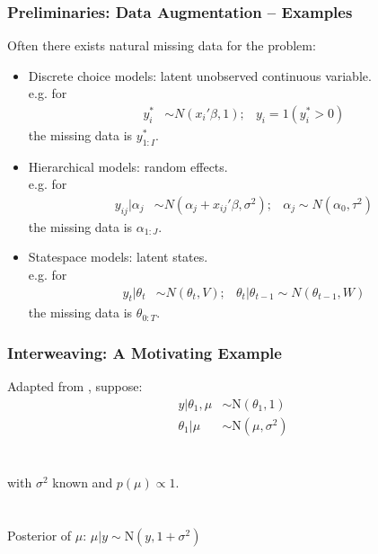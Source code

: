 \documentclass[xcolor=dvipsnames]{beamer}
\newcommand\N{\mathrm{N}}
\begin{document}
\begin{frame}
\frametitle{Preliminaries: Data Augmentation -- Examples}

Often there exists natural missing data for the problem:
\begin{itemize}
\item Discrete choice models: latent unobserved continuous variable.\\
e.g. for 
\begin{align*}
y_i^*&\sim N(x_i'\beta,1); &y_i=1(y_i^*>0)
\end{align*}
the missing data is $y_{1:I}^*$.
\pause\item Hierarchical models: random effects.\\
e.g. for
\begin{align*}
y_{ij}|\alpha_j&\sim N(\alpha_j + x_{ij}'\beta, \sigma^2); &\alpha_j\sim N(\alpha_0,\tau^2)
\end{align*}
the missing data is $\alpha_{1:J}$.
\pause\item Statespace models: latent states.\\
e.g. for
\begin{align*}
y_t|\theta_t&\sim N(\theta_t,V); &\theta_t|\theta_{t-1}\sim N(\theta_{t-1},W)
\end{align*}
the missing data is $\theta_{0:T}$.
\end{itemize}
\end{frame}



\begin{frame}
\frametitle{Interweaving: A Motivating Example}
Adapted from \citet{yu2011center}, suppose:\\
\begin{align*}
y|\theta_1, \mu & \sim \N(\theta_1, 1) \\
\theta_1|\mu & \sim \N(\mu, \sigma^2) 
\end{align*}\\~\\
with $\sigma^2$ known and $p(\mu)\propto 1$.\\~\\~\\

Posterior of $\mu$: $\mu|y \sim \N(y,1+\sigma^2)$

\end{frame}
\end{document}

